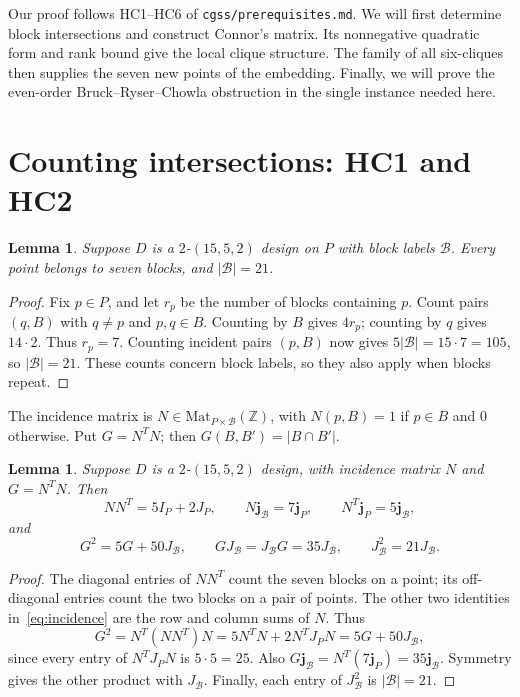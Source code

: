 \documentclass[11pt]{article}
\newcommand\cB{{\mathcal B}}
\newcommand\ints{{\mathbb Z}}
\newcommand\Zj{{\mathbf j}}
\newcommand\mat[3]{\mathrm{Mat}_{#1\times #2}(#3)}
\newtheorem{lemma}[theorem]{Lemma}
\theoremstyle{definition}
\newcommand{\code}[1]{{\small\nolinkurl{#1}}}
\begin{document}
Our proof follows HC1--HC6 of \code{cgss/prerequisites.md}. We will first
determine block intersections and construct Connor's matrix. Its
nonnegative quadratic form and rank bound give the local clique
structure. The family of all six-cliques then supplies the seven new
points of the embedding. Finally, we will prove the even-order
Bruck--Ryser--Chowla obstruction in the single instance needed here.

\section{Counting intersections: HC1 and HC2}

\begin{lemma}\label{lem:parameters}
Suppose $D$ is a $2$-$(15,5,2)$ design on $P$ with block labels $\cB$.
Every point belongs to seven blocks, and $|\cB|=21$.
\end{lemma}
\begin{proof}
Fix $p\in P$, and let $r_p$ be the number of blocks containing $p$.
Count pairs $(q,B)$ with $q\ne p$ and $p,q\in B$. Counting by $B$ gives
$4r_p$; counting by $q$ gives $14\cdot2$. Thus $r_p=7$. Counting
incident pairs $(p,B)$ now gives $5|\cB|=15\cdot7=105$, so
$|\cB|=21$. These counts concern block labels, so they also apply when
blocks repeat.
\end{proof}


The incidence matrix is $N\in\mat{P}{\cB}{\ints}$, with $N(p,B)=1$
if $p\in B$ and $0$ otherwise. Put $G=N^TN$; then
$G(B,B')=|B\cap B'|$.

\begin{lemma}\label{lem:matrix-identities}
Suppose $D$ is a $2$-$(15,5,2)$ design, with incidence matrix $N$ and
$G=N^TN$. Then
\begin{equation}\label{eq:incidence}
 NN^T=5I_P+2J_P,\qquad
 N\Zj_{\cB}=7\Zj_P,\qquad N^T\Zj_P=5\Zj_{\cB},
\end{equation}
and
\begin{equation}\label{eq:G-identities}
 G^2=5G+50J_{\cB},\qquad
 GJ_{\cB}=J_{\cB}G=35J_{\cB},\qquad J_{\cB}^2=21J_{\cB}.
\end{equation}
\end{lemma}
\begin{proof}
The diagonal entries of $NN^T$ count the seven blocks on a point; its
off-diagonal entries count the two blocks on a pair of points.
The other two identities in~\eqref{eq:incidence} are the row and column
sums of $N$. Thus
\[
 G^2=N^T(NN^T)N=5N^TN+2N^TJ_PN=5G+50J_{\cB},
\]
since every entry of $N^TJ_PN$ is $5\cdot5=25$.
Also $G\Zj_{\cB}=N^T(7\Zj_P)=35\Zj_{\cB}$. Symmetry gives the
other product with $J_{\cB}$. Finally, each entry of $J_{\cB}^2$ is
$|\cB|=21$.
\end{proof}
\end{document}
